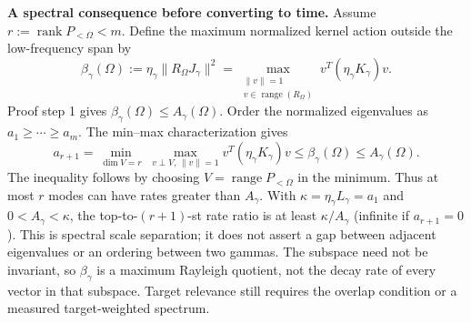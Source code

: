 \documentclass[11pt]{article}
\theoremstyle{definition}
\begin{document}
\textbf{A spectral consequence before converting to time.}
Assume $r:=\operatorname{rank}P_{<\Omega}<m$.
Define the maximum normalized kernel action outside the low-frequency span by
\begin{equation*}
 \beta_\gamma(\Omega):=\eta_\gamma\|R_\Omega J_\gamma\|^2
 =\max_{\substack{\|v\|=1\\v\in\operatorname{range}(R_\Omega)}}
 v^T(\eta_\gamma K_\gamma)v.
\end{equation*}
Proof step 1 gives $\beta_\gamma(\Omega)\le A_\gamma(\Omega)$.
Order the normalized eigenvalues
as $a_1\ge\cdots\ge a_m$. The min--max characterization gives
\begin{equation*}
 a_{r+1}
 =\min_{\dim V=r}\;\max_{v\perp V,\,\|v\|=1}v^T(\eta_\gamma K_\gamma)v
 \le\beta_\gamma(\Omega)\le A_\gamma(\Omega).
\end{equation*}
The inequality follows by choosing $V=\operatorname{range}P_{<\Omega}$ in
the minimum. Thus at most $r$ modes can have rates greater than $A_\gamma$.
With $\kappa=\eta_\gamma L_\gamma=a_1$ and $0<A_\gamma<\kappa$, the
top-to-$(r+1)$-st rate ratio is at least $\kappa/A_\gamma$ (infinite if
$a_{r+1}=0$). This is spectral scale separation; it does not assert a gap
between adjacent eigenvalues or an ordering between two gammas. The subspace
need not be invariant, so $\beta_\gamma$ is a maximum Rayleigh quotient, not
the decay rate of every vector in that subspace. Target relevance still
requires the overlap condition or a measured target-weighted spectrum.
\end{document}
